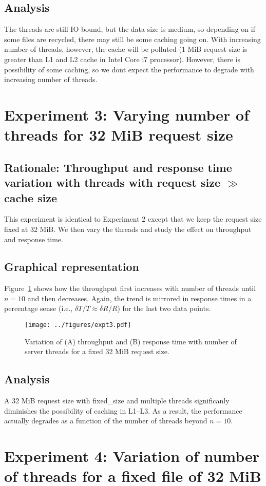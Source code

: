 \documentclass[11pt,letterpaper]{article}
\begin{document}
\subsection{Analysis}
The threads are still IO bound, but the data size is medium, so depending on if some files are recycled, there may still be some caching going on. With increasing number of threads, however, the cache will be polluted (1 MiB request size is greater than L1 and L2 cache in Intel Core i7 processor). However, there is possibility of some caching, so we dont expect the performance to degrade with increasing number of threads. 
\section{Experiment 3: Varying number of threads for 32 MiB request size}
\subsection{Rationale: Throughput and response time variation with threads with request size $\gg$ cache size}
This experiment is identical to Experiment 2 except that we keep the request size fixed at 32 MiB. We then vary the threads and study the effect on throughput and response time. 
\subsection{Graphical representation}
Figure~\ref{fig:expt3} shows how the throughput first increases with number of threads until $n=10$ and then decreases. Again, the trend is mirrored in response times in a percentage sense (i.e., $\delta T/T \approx \delta R/R$) for the last two data points.  
\begin{figure}[!tbp]
\centering
\texttt{[image: ../figures/expt3.pdf]}
\caption{Variation of (A) throughput and (B) response time with number of server threads for a fixed 32 MiB request size.\label{fig:expt3}}
\end{figure}
\subsection{Analysis}
A 32 MiB request size with {\sc fixed_size} and multiple threads significanly diminishes the possibility of caching in L1--L3. As a result, the performance actually degrades as a function of the number of threads beyond $n = 10$. 

\section{Experiment 4: Variation of number of threads for a fixed file of 32 MiB}
\end{document}
